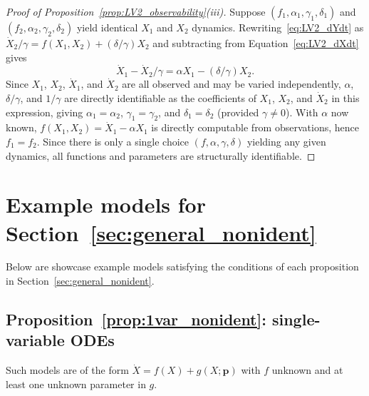 \documentclass{article}
\theoremstyle{plain}
\theoremstyle{definition}
\renewcommand{\vec}[1]{\boldsymbol{#1}}
\begin{document}
{\begin{proof}[Proof of Proposition~\ref{prop:LV2_observability}(iii)]
Suppose $(f_1, \alpha_1, \gamma_1, \delta_1)$ and $(f_2, \alpha_2, \gamma_2, \delta_2)$ yield identical $X_1$ and $X_2$ dynamics. Rewriting~\eqref{eq:LV2_dYdt} as $\dot{X}_2/\gamma = f(X_1,X_2) + (\delta/\gamma)X_2$ and subtracting from Equation~\eqref{eq:LV2_dXdt} gives
\begin{equation*}
    \dot{X}_1 - \dot{X}_2/\gamma = \alpha X_1 - (\delta/\gamma)X_2.
\end{equation*}
Since $X_1$, $X_2$, $\dot{X}_1$, and $\dot{X}_2$ are all observed and may be varied independently, $\alpha$, $\delta/\gamma$, and $1/\gamma$ are directly identifiable as the coefficients of $X_1$, $X_2$, and $\dot{X}_2$ in this expression, giving $\alpha_1 = \alpha_2$, $\gamma_1 = \gamma_2$, and $\delta_1 = \delta_2$ (provided $\gamma \neq 0$). With $\alpha$ now known, $f(X_1,X_2) = \dot{X}_1 - \alpha X_1$ is directly computable from observations, hence $f_1 = f_2$. Since there is only a single choice $(f, \alpha, \gamma, \delta)$ yielding any given dynamics, all functions and parameters are structurally identifiable.
\end{proof}


\section{Example models for Section~\ref{sec:general_nonident}} \label{appendix:example_models}

Below are showcase example models satisfying the conditions of each proposition in Section~\ref{sec:general_nonident}.


\subsection{Proposition~\ref{prop:1var_nonident}: single-variable ODEs} \label{appendix:examples_1var}

Such models are of the form $\dot{X} = f(X) + g(X;\vec{p})$ with $f$ unknown and at least one unknown parameter in $g$.

}
\end{document}
